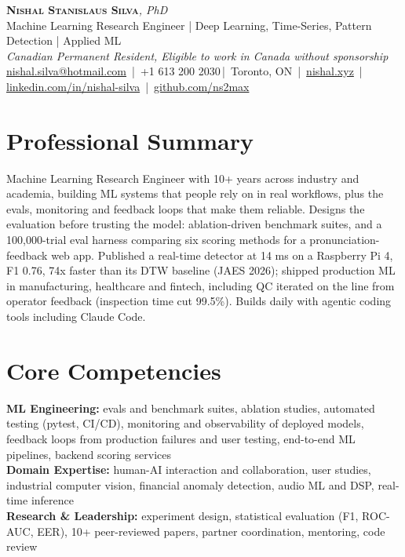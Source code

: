 \documentclass[11pt]{article}
\makeatletter
\newcommand{\cvName}{Nishal Stanislaus Silva}
\newcommand{\cvEmail}{nishal.silva@hotmail.com}
\newcommand{\cvPhone}{+1 613 200 2030}
\newcommand{\cvCity}{Toronto, ON}
\newcommand{\cvSite}{https://nishal.xyz}
\newcommand{\cvLinkedIn}{https://www.linkedin.com/in/nishal-silva}
\newcommand{\cvGitHub}{https://github.com/ns2max}
\newcommand{\cvStatus}{Canadian Permanent Resident, Eligible to work in Canada without sponsorship}
\newcommand{\cvTagline}{Machine Learning Research Engineer | Deep Learning, Time-Series, Pattern Detection | Applied ML}
\makeatother
\begin{document}
\pagestyle{empty}

\begin{center}
    {\LARGE \scshape \textbf{\cvName}}{\large \textit{, PhD}}
    \\[1pt]
    {\small \cvTagline}
    \\[1pt]
    {\footnotesize\textit{\cvStatus}}
    \\[1pt]
    {\small
    \href{mailto:\cvEmail}{\cvEmail} \,|\, \cvPhone \,|\, \cvCity
    \,|\, \href{\cvSite}{nishal.xyz} \,|\, \href{\cvLinkedIn}{linkedin.com/in/nishal-silva}
    \,|\, \href{\cvGitHub}{github.com/ns2max}}
\end{center}

\section*{Professional Summary}
Machine Learning Research Engineer with 10+ years across industry and academia, building ML systems that people rely on in real workflows, plus the evals, monitoring and feedback loops that make them reliable. Designs the evaluation before trusting the model: ablation-driven benchmark suites, and a 100,000-trial eval harness comparing six scoring methods for a pronunciation-feedback web app. Published a real-time detector at 14 ms on a Raspberry Pi 4, F1 0.76, 74x faster than its DTW baseline (JAES 2026); shipped production ML in manufacturing, healthcare and fintech, including QC iterated on the line from operator feedback (inspection time cut 99.5\%). Builds daily with agentic coding tools including Claude Code.

\section*{Core Competencies}
\textbf{ML Engineering:} evals and benchmark suites, ablation studies, automated testing (pytest, CI/CD), monitoring and \mbox{observability} of deployed models, feedback loops from production failures and user testing, end-to-end ML pipelines, backend scoring services\\
\textbf{Domain Expertise:} human-AI interaction and collaboration, user studies, industrial computer vision, financial anomaly detection, audio ML and DSP, real-time inference\\
\textbf{Research \& Leadership:} experiment design, statistical evaluation (F1, ROC-AUC, EER), 10+ peer-reviewed papers, partner coordination, mentoring, code review
\end{document}
